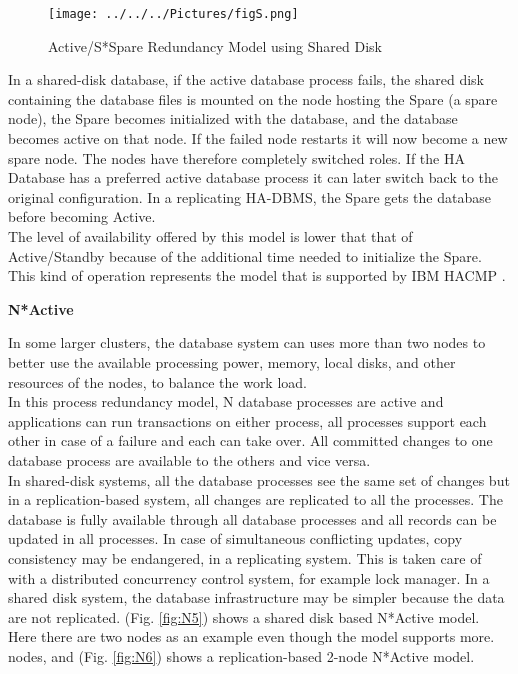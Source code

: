\documentclass[english]{tktltiki2}
\theoremstyle{definition}
\theoremstyle{remark}
\begin{document}
\begin{figure}[h!]
\texttt{[image: ../../../Pictures/figS.png]} 
\caption{Active/S*Spare Redundancy Model using Shared Disk \cite{inproceedings}}
\label{fig:N4}
\end{figure}

\pagebreak
In a shared-disk database, if the active database process fails, the shared disk containing the database files is mounted on the node hosting the Spare (a spare node), the Spare becomes initialized with the database, and the database becomes active on that node. If the failed node restarts it will now become a new spare node. The nodes have therefore completely switched roles. 
If the HA Database has a preferred active database process it can later switch back to the original configuration.
In a replicating HA-DBMS, the Spare gets the database before becoming Active.\\
The level of availability offered by this model is lower that that of Active/Standby because of the additional time needed to initialize the Spare.\\
This kind of operation represents the model that is supported by IBM HACMP \cite{IBM}.

\begin{flushleft}
\textbf{N*Active}
\end{flushleft}
In some larger clusters, the database system can uses more than two nodes to better use the available processing power, memory, local disks, and other resources of the nodes, to balance the work load.\\
In this process redundancy model, N database processes are
active and applications can run transactions on either process, all processes support each other in case of a failure and each can take over.
All committed changes to one database process are available to the others and vice versa.\\
In shared-disk systems, all the database processes see the same set of changes but in a replication-based system, all changes are replicated to all the processes.
The database is fully available through all database processes and all records can be updated in all processes. In case of simultaneous conflicting updates, copy consistency may be endangered, in a replicating system. This is taken care of with a distributed concurrency control system, for example lock manager. In a shared disk system, the database infrastructure may be simpler because the data are not replicated.
(Fig. \ref{fig:N5}) shows a shared disk based N*Active model.
Here there are two nodes as an example even though the model supports more.
nodes, and  (Fig. \ref{fig:N6}) shows a replication-based 2-node N*Active model.
\end{document}
